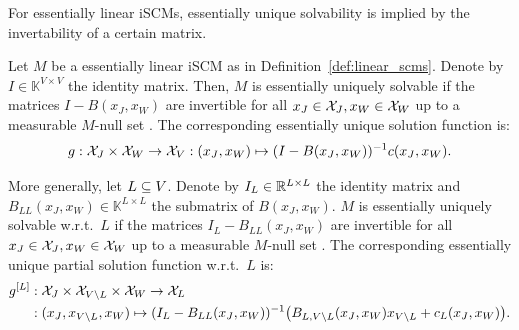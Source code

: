 For essentially linear iSCMs, essentially unique solvability is implied by the invertability of a certain matrix.
\begin{Prp}\label{prp:linear_scms}
Let $M$ be a essentially linear iSCM as in Definition~\ref{def:linear_scms}.
Denote by $I \in \mathbb{K}^{V \times V}$ the identity matrix.
Then, $M$ is essentially uniquely solvable if the matrices $I-B(x_J,x_W)$ are invertible for all $x_J \in \mathcal{X}_J, x_W \in \mathcal{X}_W$ up to a measurable $M$-null set \TODOmas.
The corresponding essentially unique solution function is:
  $$g : \mathcal{X}_J \times \mathcal{X}_W \to \mathcal{X}_V : (x_J,x_W) \mapsto (I - B(x_J,x_W))^{-1} c(x_J,x_W).$$

More generally, let $L \subseteq V$.
  Denote by $I_L \in \mathbb{R}^{L \times L}$ the identity matrix and $B_{LL}(x_J,x_W) \in \mathbb{K}^{L \times L}$ the submatrix of $B(x_J,x_W)$.
$M$ is essentially uniquely solvable w.r.t.\ $L$ if the matrices $I_{L}-B_{LL}(x_J,x_W)$ are invertible for all $x_J \in \mathcal{X}_J, x_W \in \mathcal{X}_W$ up to a measurable $M$-null set \TODOmas.
The corresponding essentially unique partial solution function w.r.t.\ $L$ is:
  \begin{equation*}\begin{split}
    g^{[L]} &: \mathcal{X}_J \times \mathcal{X}_{V\setminus L} \times \mathcal{X}_W \to \mathcal{X}_L \\
      &: (x_J,x_{V\setminus L},x_W) \mapsto (I_L - B_{LL}(x_J,x_W))^{-1} \big(B_{L,{V\setminus L}}(x_J,x_W) x_{V\setminus L} + c_{L}(x_J,x_W)\big).
  \end{split}\end{equation*}
\end{Prp}

